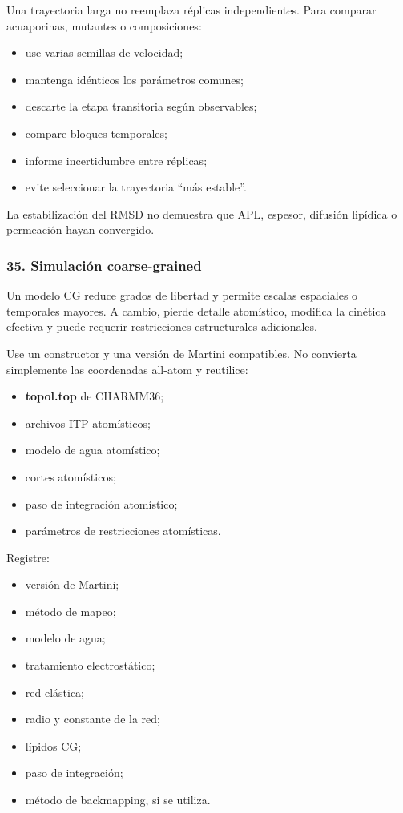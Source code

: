 \documentclass[
  spanish,
  11pt,
  a4paper]{article}
\providecommand{\tightlist}{%
  \setlength{\itemsep}{0pt}\setlength{\parskip}{0pt}}
\begin{document}
Una trayectoria larga no reemplaza réplicas independientes. Para
comparar acuaporinas, mutantes o composiciones:

\begin{itemize}
\tightlist
\item
  use varias semillas de velocidad;
\item
  mantenga idénticos los parámetros comunes;
\item
  descarte la etapa transitoria según observables;
\item
  compare bloques temporales;
\item
  informe incertidumbre entre réplicas;
\item
  evite seleccionar la trayectoria ``más estable''.
\end{itemize}

La estabilización del RMSD no demuestra que APL, espesor, difusión
lipídica o permeación hayan convergido.

\subsubsection{35. Simulación
coarse-grained}\label{simulaciuxf3n-coarse-grained}

Un modelo CG reduce grados de libertad y permite escalas espaciales o
temporales mayores. A cambio, pierde detalle atomístico, modifica la
cinética efectiva y puede requerir restricciones estructurales
adicionales.

Use un constructor y una versión de Martini compatibles. No convierta
simplemente las coordenadas all-atom y reutilice:

\begin{itemize}
\tightlist
\item
  \textbf{topol.top} de CHARMM36;
\item
  archivos ITP atomísticos;
\item
  modelo de agua atomístico;
\item
  cortes atomísticos;
\item
  paso de integración atomístico;
\item
  parámetros de restricciones atomísticas.
\end{itemize}

Registre:

\begin{itemize}
\tightlist
\item
  versión de Martini;
\item
  método de mapeo;
\item
  modelo de agua;
\item
  tratamiento electrostático;
\item
  red elástica;
\item
  radio y constante de la red;
\item
  lípidos CG;
\item
  paso de integración;
\item
  método de backmapping, si se utiliza.
\end{itemize}
\end{document}
